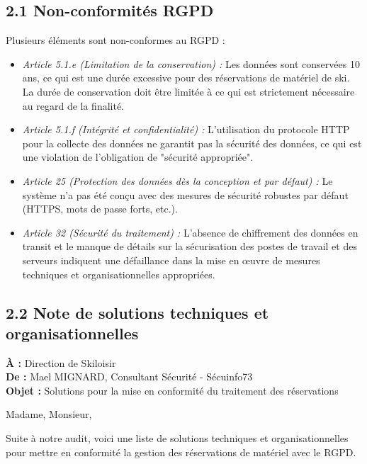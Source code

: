 \documentclass[12pt,a4paper]{article}
\begin{document}
\subsection*{2.1 Non-conformités RGPD}
Plusieurs éléments sont non-conformes au RGPD :
\begin{itemize}
    	\item \textit{Article 5.1.e (Limitation de la conservation) :} Les données sont conservées 10 ans, ce qui est une durée excessive pour des réservations de matériel de ski. La durée de conservation doit être limitée à ce qui est strictement nécessaire au regard de la finalité.
    	\item \textit{Article 5.1.f (Intégrité et confidentialité) :} L'utilisation du protocole HTTP pour la collecte des données ne garantit pas la sécurité des données, ce qui est une violation de l'obligation de "sécurité appropriée".
    	\item \textit{Article 25 (Protection des données dès la conception et par défaut) :} Le système n'a pas été conçu avec des mesures de sécurité robustes par défaut (HTTPS, mots de passe forts, etc.).
    	\item \textit{Article 32 (Sécurité du traitement) :} L'absence de chiffrement des données en transit et le manque de détails sur la sécurisation des postes de travail et des serveurs indiquent une défaillance dans la mise en œuvre de mesures techniques et organisationnelles appropriées.
\end{itemize}

\subsection*{2.2 Note de solutions techniques et organisationnelles}
\textbf{À :} Direction de Skiloisir \\
\textbf{De :} Mael MIGNARD, Consultant Sécurité - Sécuinfo73 \\
\textbf{Objet :} Solutions pour la mise en conformité du traitement des réservations

Madame, Monsieur,

Suite à notre audit, voici une liste de solutions techniques et organisationnelles pour mettre en conformité la gestion des réservations de matériel avec le RGPD.
\end{document}
